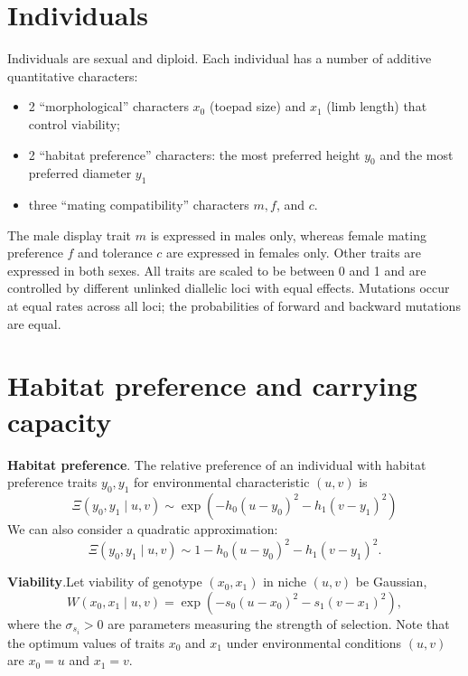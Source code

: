\documentclass{article}
\begin{document}
\section{Individuals}

Individuals are sexual and diploid. Each individual has a number of additive quantitative characters:
\begin{itemize}
  \item 2 ``morphological'' characters $x_0$ (toepad size) and $x_1$
    (limb length) that control viability;
  \item 2 ``habitat preference'' characters: the most preferred height
    $y_0$ and the most preferred diameter $y_1$
  \item three ``mating compatibility'' characters $m, f$, and $c$.
\end{itemize}

The male display trait $m$ is expressed in males only, whereas female mating preference $f$ and tolerance $c$ are expressed in females only.
Other traits are expressed in both sexes.
All traits are scaled to be between 0 and 1 and are controlled by different unlinked diallelic loci with equal effects.
Mutations occur at equal rates across all loci;
the probabilities of forward and backward mutations are equal.


\newpage
\section{Habitat preference and carrying capacity}

{\bf Habitat preference}.\quad
The relative preference of an individual with habitat preference traits $y_0,y_1$ for environmental characteristic $(u,v)$ is 
\begin{equation}
  \Xi(y_0,y_1\mid u,v) \sim \exp(-h_0(u-y_0)^2-h_1(v-y_1)^2)
\end{equation}
We can also consider a quadratic approximation:
\begin{equation} \label{quad}
  \Xi(y_0,y_1\mid u,v) \sim 1-h_0(u-y_0)^2-h_1(v-y_1)^2.
\end{equation}

{\bf Viability}.\quad Let viability of genotype $(x_0,x_1)$ in niche $(u,v)$ be Gaussian,
\begin{equation}
  W(x_0,x_1 \mid u,v) = \exp(-s_0(u-x_0)^2-s_1(v-x_1)^2),
\end{equation}
where the $\sigma_{s_i}>0$ are parameters measuring the strength of selection.
Note that the optimum values of traits $x_0$ and $x_1$ under environmental conditions $(u,v)$ are $x_0 = u$ and $x_1 = v$.\\
\end{document}
